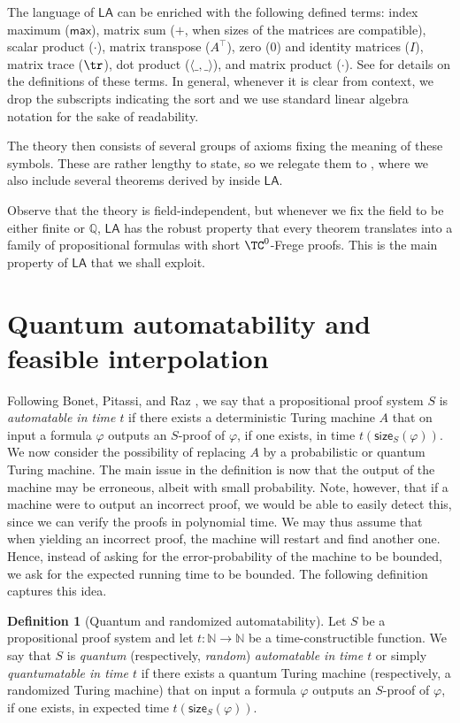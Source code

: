 \documentclass[11pt]{article}
\newcommand{\LA}{\mathsf{LA}}
\theoremstyle{definition}
\newtheorem{definition}{Definition}[section]
\theoremstyle{plain}
\theoremstyle{remark}
\newcommand{\bQ}{\mathbb{Q}}
\begin{document}
The language of $\LA$ can be enriched with the following defined terms: index maximum ($\mathsf{max}$), matrix sum ($+$, when sizes of the matrices are compatible), scalar product ($\cdot$), matrix transpose ($A^\intercal$), zero ($0$) and identity matrices ($I$), matrix trace ($\tr$), dot product ($\langle \_, \_\rangle$), and matrix product ($\cdot$). See \autocite[Section 2.1]{cooksoltys} for details on the definitions of these terms. In general, whenever it is clear from context, we drop the subscripts indicating the sort and we use standard linear algebra notation for the sake of readability.

The theory then consists of several groups of axioms fixing the meaning of these symbols. These are rather lengthy to state, so we relegate them to , where we also include several theorems derived by \citeauthor{cooksoltys} inside $\LA$.

Observe that the theory is field-independent, but whenever we fix the field to be either finite or $\bQ$, $\LA$ has the robust property that every theorem translates into a family of propositional formulas with short $\TC^0$-Frege proofs. This is the main property of $\LA$ that we shall exploit.

\section{Quantum automatability and feasible interpolation}
\label{sec:qauto}

Following Bonet, Pitassi, and Raz \cite{BPR1997}, we say that a propositional proof system $S$ is \emph{automatable in time $t$} if there exists a deterministic Turing machine $A$ that on input a formula $\varphi$ outputs an $S$-proof of $\varphi$, if one exists, in time $t(\mathsf{size}_S(\varphi))$. We now consider the possibility of replacing $A$ by a probabilistic or quantum Turing machine. The main issue in the definition is now that the output of the machine may be erroneous, albeit with small probability. Note, however, that if a machine were to output an incorrect proof, we would be able to easily detect this, since we can verify the proofs in polynomial time. We may thus assume that when yielding an incorrect proof, the machine will restart and find another one. Hence, instead of asking for the error-probability of the machine to be bounded, we ask for the expected running time to be bounded. The following definition captures this idea.

\begin{definition}[Quantum and randomized automatability]
\label{def:q-aut}
Let $S$ be a propositional proof system and let $t : \mathbb{N} \to \mathbb{N}$ be a time-constructible function. We say that $S$ is \emph{quantum} (respectively, \emph{random}) \emph{automatable in time $t$} or simply \emph{quantumatable in time $t$} if there exists a quantum Turing machine (respectively, a randomized Turing machine) that on input a formula $\varphi$ outputs an $S$-proof of $\varphi$, if one exists, in expected time $t(\mathsf{size}_S(\varphi))$.
\end{definition}
\end{document}
